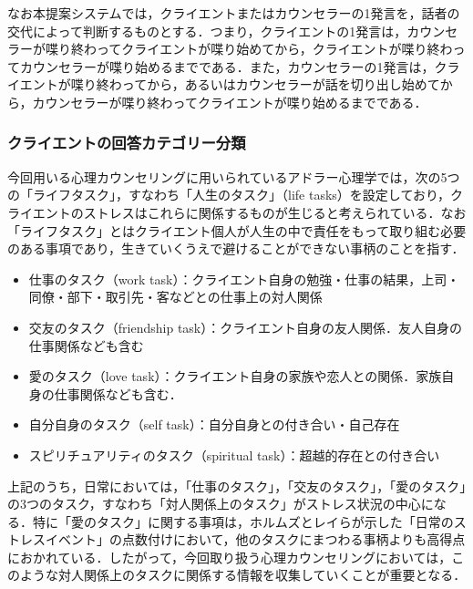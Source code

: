 \documentclass[shuuron]{kuee}
\begin{document}

なお本提案システムでは，クライエントまたはカウンセラーの1発言を，話者の交代によって判断するものとする．つまり，クライエントの1発言は，カウンセラーが喋り終わってクライエントが喋り始めてから，クライエントが喋り終わってカウンセラーが喋り始めるまでである．また，カウンセラーの1発言は，クライエントが喋り終わってから，あるいはカウンセラーが話を切り出し始めてから，カウンセラーが喋り終わってクライエントが喋り始めるまでである．

\subsubsection{クライエントの回答カテゴリー分類}


今回用いる心理カウンセリングに用いられているアドラー心理学では，次の5つの「ライフタスク」，すなわち「人生のタスク」（life tasks）を設定しており，クライエントのストレスはこれらに関係するものが生じると考えられている．なお「ライフタスク」とはクライエント個人が人生の中で責任をもって取り組む必要のある事項であり，生きていくうえで避けることができない事柄のことを指す．
\begin{itemize}
  \item 仕事のタスク（work task）：クライエント自身の勉強・仕事の結果，上司・同僚・部下・取引先・客などとの仕事上の対人関係
  \item 交友のタスク（friendship task）：クライエント自身の友人関係．友人自身の仕事関係なども含む
  \item 愛のタスク（love task）：クライエント自身の家族や恋人との関係．家族自身の仕事関係なども含む．
  \item 自分自身のタスク（self task）：自分自身との付き合い・自己存在
  \item スピリチュアリティのタスク（spiritual task）：超越的存在との付き合い\cite{大友秀治2013全人的人間理解を促進するスピリチュアリティ概念に関する一考察}
\end{itemize}

上記のうち，日常においては，「仕事のタスク」，「交友のタスク」，「愛のタスク」の3つのタスク，すなわち「対人関係上のタスク」がストレス状況の中心になる．特に「愛のタスク」に関する事項は，ホルムズとレイら\cite{holmes1967social}が示した「日常のストレスイベント」の点数付けにおいて，他のタスクにまつわる事柄よりも高得点におかれている．したがって，今回取り扱う心理カウンセリングにおいては，このような対人関係上のタスクに関係する情報を収集していくことが重要となる．
\end{document}
